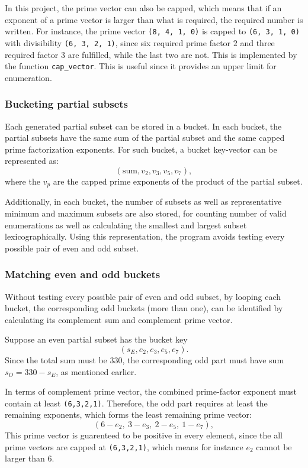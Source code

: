 \documentclass[11pt,a4paper]{article}
\begin{document}
In this project, the prime vector can also be capped, which means that if an exponent of a prime vector is larger than what is required, the required number is written. For instance, the prime vector \texttt{(8, 4, 1, 0)} is capped to \texttt{(6, 3, 1, 0)} with divisibility \texttt{(6, 3, 2, 1)}, since six required prime factor $2$ and three required factor $3$ are fulfilled, while the last two are not. This is implemented by the function \texttt{cap\_vector}. This is useful since it provides an upper limit for enumeration.

\subsubsection*{Bucketing partial subsets}

Each generated partial subset can be stored in a bucket. In each bucket, the partial subsets have the same sum of the partial subset and the same capped prime factorization exponents. For such bucket, a bucket key-vector can be represented as:
\[
(\text{sum},v_2,v_3,v_5,v_7),
\]
where the $v_p$ are the capped prime exponents of the product of the partial subset.

Additionally, in each bucket, the number of subsets as well as representative minimum and maximum subsets are also stored, for counting number of valid enumerations as well as calculating the smallest and largest subset lexicographically. Using this representation, the program avoids testing every possible pair of even and odd subset.

\subsubsection*{Matching even and odd buckets}

Without testing every possible pair of even and odd subset, by looping each bucket, the corresponding odd buckets (more than one), can be identified by calculating its complement sum and complement prime vector.

Suppose an even partial subset has the bucket key
\[
(s_E,e_2,e_3,e_5,e_7).
\]
Since the total sum must be $330$, the corresponding odd part must have sum $s_O=330-s_E$, as mentioned earlier. 

In terms of complement prime vector, the combined prime-factor exponent must contain at least \texttt{(6,3,2,1)}. Therefore, the odd part requires at least the remaining exponents, which forms the least remaining prime vector:
\[
(6-e_2,\ 3-e_3,\ 2-e_5,\ 1-e_7),
\]
This prime vector is guarenteed to be positive in every element, since the all prime vectors are capped at \texttt{(6,3,2,1)}, which means for instance $e_2$ cannot be larger than $6$.
\end{document}
